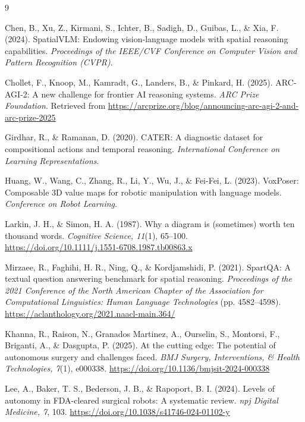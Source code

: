 \documentclass[stu,12pt,a4paper,floatsintext]{apa7}
\begin{document}
\newpage
\begin{thebibliography}{9}

Chen, B., Xu, Z., Kirmani, S., Ichter, B., Sadigh, D., Guibas, L., \& Xia, F. (2024). SpatialVLM: Endowing vision-language models with spatial reasoning capabilities. \emph{Proceedings of the IEEE/CVF Conference on Computer Vision and Pattern Recognition (CVPR)}.

Chollet, F., Knoop, M., Kamradt, G., Landers, B., \& Pinkard, H. (2025). ARC-AGI-2: A new challenge for frontier AI reasoning systems. \emph{ARC Prize Foundation}. Retrieved from \url{https://arcprize.org/blog/announcing-arc-agi-2-and-arc-prize-2025}

Girdhar, R., \& Ramanan, D. (2020). CATER: A diagnostic dataset for compositional actions and temporal reasoning. \emph{International Conference on Learning Representations}.

Huang, W., Wang, C., Zhang, R., Li, Y., Wu, J., \& Fei-Fei, L. (2023). VoxPoser: Composable 3D value maps for robotic manipulation with language models. \emph{Conference on Robot Learning}.

Larkin, J. H., \& Simon, H. A. (1987). Why a diagram is (sometimes) worth ten thousand words. \emph{Cognitive Science, 11}(1), 65--100. \url{https://doi.org/10.1111/j.1551-6708.1987.tb00863.x}

Mirzaee, R., Faghihi, H. R., Ning, Q., \& Kordjamshidi, P. (2021). SpartQA: A textual question answering benchmark for spatial reasoning. \emph{Proceedings of the 2021 Conference of the North American Chapter of the Association for Computational Linguistics: Human Language Technologies} (pp. 4582--4598). \url{https://aclanthology.org/2021.naacl-main.364/}

Khanna, R., Raison, N., Granados Martinez, A., Ourselin, S., Montorsi, F., Briganti, A., \& Dasgupta, P. (2025). At the cutting edge: The potential of autonomous surgery and challenges faced. \emph{BMJ Surgery, Interventions, \& Health Technologies, 7}(1), e000338. \url{https://doi.org/10.1136/bmjsit-2024-000338}

Lee, A., Baker, T. S., Bederson, J. B., \& Rapoport, B. I. (2024). Levels of autonomy in FDA-cleared surgical robots: A systematic review. \emph{npj Digital Medicine, 7}, 103. \url{https://doi.org/10.1038/s41746-024-01102-y}


\end{thebibliography}
\end{document}
